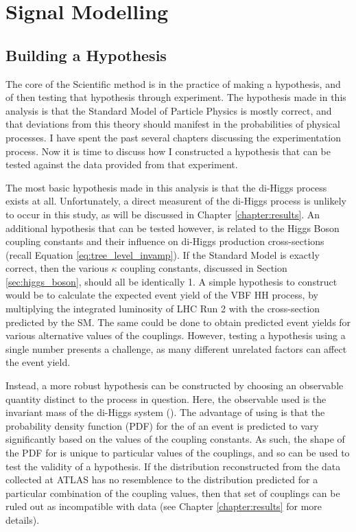\chapter{Signal Modelling}

\section{Building a Hypothesis}

    The core of the Scientific method is in the practice of making a hypothesis,
        and of then testing that hypothesis through experiment.
    The hypothesis made in this analysis is that the Standard Model of Particle Physics is mostly correct,
        and that deviations from this theory should manifest in the probabilities of physical processes.
    I have spent the past several chapters discussing the experimentation process.
    Now it is time to discuss how I constructed a hypothesis that can be tested against the data provided from that experiment.

    The most basic hypothesis made in this analysis is that the di-Higgs process exists at all.
    Unfortunately, a direct measurent of the di-Higgs process is unlikely to occur in this study, as will be discussed in Chapter \ref{chapter:results}.
    An additional hypothesis that can be tested however,
        is related to the Higgs Boson coupling constants and their influence on di-Higgs production cross-sections
        (recall Equation \ref{eq:tree_level_invamp}).
    If the Standard Model is exactly correct, then the various $\kappa$ coupling constants,
        discussed in Section \ref{sec:higgs_boson},
        should all be identically 1.
    A simple hypothesis to construct would be to calculate the expected event yield of the VBF \to HH process,
        by multiplying the integrated luminosity of LHC Run 2 with the cross-section predicted by the SM.
    The same could be done to obtain predicted event yields for various alternative values of the couplings.
    However, testing a hypothesis using a single number presents a challenge, as many different unrelated factors can affect the event yield.

    Instead, a more robust hypothesis can be constructed by choosing an observable quantity distinct to the process in question.
    Here, the observable used is the invariant mass of the di-Higgs system (\mhh).
    The advantage of using \mhh is that the probability density function (PDF) for the \mhh of an event
        is predicted to vary significantly based on the values of the \kappa coupling constants.
    As such, the shape of the PDF for \mhh is unique to particular values of the couplings, 
        and so can be used to test the validity of a hypothesis.
    If the \mhh distribution reconstructed from the data collected at ATLAS has no resemblence to
        the \mhh distribution predicted for a particular combination of the coupling values,
        then that set of couplings can be ruled out as incompatible with data
        (see Chapter \ref{chapter:results} for more details).


